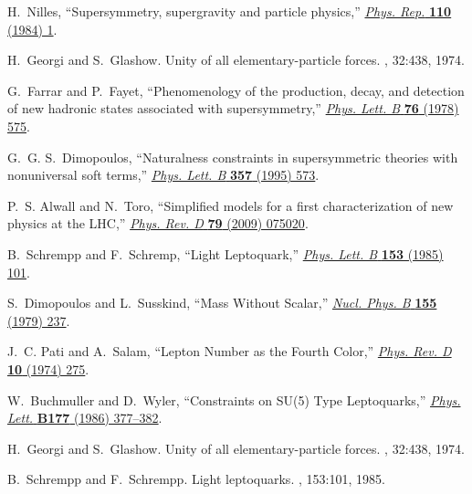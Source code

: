 \begin{thebibliography}{99}
\onehalfspacing
H.~Nilles, ``{Supersymmetry, supergravity and particle physics},''
  \href{http://dx.doi.org/10.1016/0370-1573(84)90008-5}{{\em Phys. Rep.}
  {\bfseries 110} (1984) 1}.


H.~Georgi and S.~Glashow.
\newblock Unity of all elementary-particle forces.
, 32:438, 1974.

G.~Farrar and P.~Fayet, ``{Phenomenology of the production, decay, and
  detection of new hadronic states associated with supersymmetry},''
  \href{http://dx.doi.org/10.1016/0370-2693(78)90858-4}{{\em Phys. Lett. B}
  {\bfseries 76} (1978) 575}.

G.~G. S.~Dimopoulos, ``{Naturalness constraints in supersymmetric theories with
  nonuniversal soft terms},''
  \href{http://dx.doi.org/10.1016/0370-2693(95)00961-J}{{\em Phys. Lett. B}
  {\bfseries 357} (1995) 573}.

P.~S. Alwall and N.~Toro, ``{Simplified models for a first characterization of
  new physics at the LHC},''
  \href{http://dx.doi.org/10.1103/PhysRevD.79.075020}{{\em Phys. Rev. D}
  {\bfseries 79} (2009) 075020}.


B.~Schrempp and F.~Schremp, ``{Light Leptoquark},''
  \href{http://dx.doi.org/10.1016/0370-2693(85)91450-9}{{\em Phys. Lett. B}
  {\bfseries 153} (1985) 101}.

S.~Dimopoulos and L.~Susskind, ``{Mass Without Scalar},''
  \href{http://dx.doi.org/10.1016/0550-3213(81)90304-7}{{\em Nucl. Phys. B}
  {\bfseries 155} (1979) 237}.

J.~C. Pati and A.~Salam, ``{Lepton Number as the Fourth Color},''
  \href{http://dx.doi.org/10.1103/PhysRevD.10.275}{{\em Phys. Rev. D}
  {\bfseries 10} (1974) 275}.

W.~Buchmuller and D.~Wyler, ``{Constraints on SU(5) Type Leptoquarks},''
\href{http://dx.doi.org/10.1016/0370-2693(86)90771-9}{{\em Phys. Lett.}
  {\bfseries B177} (1986) 377--382}.

H.~Georgi and S.~Glashow.
\newblock Unity of all elementary-particle forces.
, 32:438, 1974.


B.~Schrempp and F.~Schrempp.
\newblock Light leptoquarks.
, 153:101, 1985.


\end{thebibliography}
